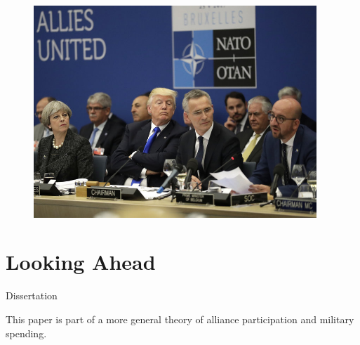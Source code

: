 \documentclass{beamer}
\begin{document}
\begin{frame}[standout]

\begin{figure}[htbp]
	\centering
		\includegraphics[width=0.95\textwidth]{trump-nato.jpg}
\end{figure}


\end{frame}


\section{Looking Ahead}


\begin{frame}{Dissertation}

This paper is part of a more general theory of alliance participation and military spending. 

\end{frame}


\end{document}
